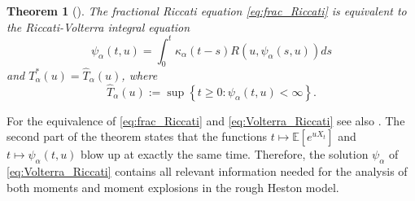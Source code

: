\documentclass[12pt,a4paper]{amsart}
\numberwithin{equation}{section}
\numberwithin{equation}{section}
\newtheorem{theorem}{Theorem}[section]
\theoremstyle{nonumberplain}
\newcommand{\E}[1]{\mathbb{E}\left[#1\right]}                     %
\newcommand{\set}[1]{\left\{#1\right\}}
\begin{document}
\begin{theorem}[\cite{gerhold2018moment}]\label{thm:mgf2}
The fractional Riccati equation \eqref{eq:frac_Riccati} is equivalent to the Riccati-Volterra integral equation
\begin{equation}\label{eq:Volterra_Riccati}
\psi_\alpha(t,u) = \int_0^t \kappa_\alpha(t-s) R(u,\psi_\alpha(s,u))ds
\end{equation}
and $T^*_\alpha(u) = \hat T_\alpha(u)$, where
\begin{equation}\label{eq:Tstar}
\hat T_\alpha(u) := \sup \set{t \ge 0: \psi_\alpha(t,u) < \infty}.
\end{equation}
\end{theorem}
For the equivalence of \eqref{eq:frac_Riccati} and \eqref{eq:Volterra_Riccati} see also \cite[Thm.~3.10]{kilbas2006theory}. The second part of the theorem states that the functions $t \mapsto \E{e^{uX_t}}$ and $t \mapsto \psi_\alpha(t,u)$ blow up at exactly the same time. Therefore, the solution $\psi_\alpha$ of \eqref{eq:Volterra_Riccati} contains all relevant information needed for the analysis of both moments and moment explosions in the rough Heston model.
\end{document}
